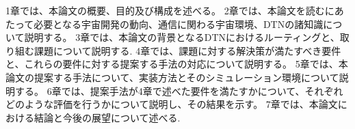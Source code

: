 1章では、本論文の概要、目的及び構成を述べる。
2章では、本論文を読むにあたって必要となる宇宙開発の動向、通信に関わる宇宙環境、DTNの諸知識について説明する。
3章では、本論文の背景となるDTNにおけるルーティングと、取り組む課題について説明する.
4章では、課題に対する解決策が満たすべき要件と、これらの要件に対する提案する手法の対応について説明する。
5章では、本論文の提案する手法について、実装方法とそのシミュレーション環境について説明する。
6章では、提案手法が4章で述べた要件を満たすかについて、それぞれどのような評価を行うかについて説明し、その結果を示す。
7章では、本論文における結論と今後の展望について述べる.